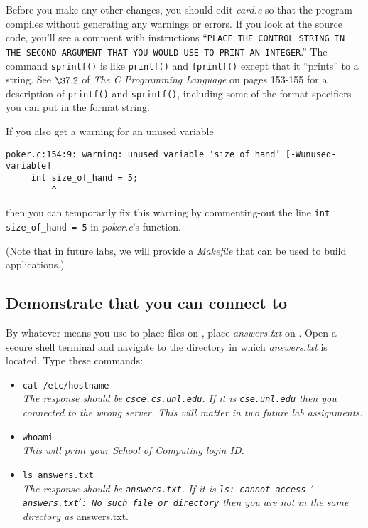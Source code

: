 Before you make any other changes, you should edit \textit{card.c} so that the
program compiles without generating any warnings or errors. If you look at the
source code, you'll see a comment with instructions ``\texttt{PLACE THE CONTROL
STRING IN THE SECOND ARGUMENT THAT YOU WOULD USE TO PRINT AN INTEGER}.'' The
command \lstinline{sprintf()} is like \lstinline{printf()} and
\lstinline{fprintf()} except that it ``prints'' to a string. See $\S7.2$ of
\textit{The C Programming Language} on pages 153-155 for a description of
\lstinline{printf()} and \lstinline{sprintf()}, including some of the format
specifiers you can put in the format string.

If you also get a warning for an unused variable
\begin{verbatim}
poker.c:154:9: warning: unused variable ‘size_of_hand’ [-Wunused-variable]
     int size_of_hand = 5;
         ^
\end{verbatim}
then you can temporarily fix this warning by commenting-out the line
\lstinline{int size_of_hand = 5} in \textit{poker.c}'s 
function.

(Note that in future labs, we will provide a \textit{Makefile} that can be used
to build applications.)

\subsection*{Demonstrate that you can connect to \runtimeenvironment}

By whatever means you use to place files on \runtimeenvironment, place
\textit{answers.txt} on \runtimeenvironment. Open a secure shell terminal and
navigate to the directory in which \textit{answers.txt} is located. Type these
commands:
\begin{itemize}
\item[]\texttt{cat /etc/hostname} \\
\textit{The response should be \texttt{csce.cs.unl.edu}. If it is
\texttt{cse.unl.edu} then you connected to the wrong server. This will matter
in two future lab assignments.}
\item[]\texttt{whoami} \\
\textit{This will print your School of Computing login ID.}
\item[]\texttt{ls answers.txt} \\
\textit{The response should be \texttt{answers.txt}. If it is \texttt{ls:
cannot access $'$answers.txt$'$: No such file or directory} then you are not in
the same directory as} answers.txt.
\end{itemize}

